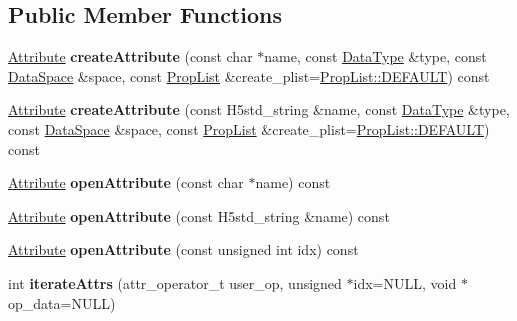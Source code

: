\subsection*{Public Member Functions}
\begin{DoxyCompactItemize}
\item 
\mbox{\label{class_h5_1_1_h5_object_acf6c4ca827b3cc08592d78c4b65252d6}} 
\hyperlink{class_h5_1_1_attribute}{Attribute} {\bfseries create\+Attribute} (const char $\ast$name, const \hyperlink{class_h5_1_1_data_type}{Data\+Type} \&type, const \hyperlink{class_h5_1_1_data_space}{Data\+Space} \&space, const \hyperlink{class_h5_1_1_prop_list}{Prop\+List} \&create\+\_\+plist=\hyperlink{class_h5_1_1_prop_list_ae52af66ce82af0ea7e6dc57148c56241}{Prop\+List\+::\+D\+E\+F\+A\+U\+LT}) const
\item 
\mbox{\label{class_h5_1_1_h5_object_a20cba569ffbb46859164668ab536b38f}} 
\hyperlink{class_h5_1_1_attribute}{Attribute} {\bfseries create\+Attribute} (const H5std\+\_\+string \&name, const \hyperlink{class_h5_1_1_data_type}{Data\+Type} \&type, const \hyperlink{class_h5_1_1_data_space}{Data\+Space} \&space, const \hyperlink{class_h5_1_1_prop_list}{Prop\+List} \&create\+\_\+plist=\hyperlink{class_h5_1_1_prop_list_ae52af66ce82af0ea7e6dc57148c56241}{Prop\+List\+::\+D\+E\+F\+A\+U\+LT}) const
\item 
\mbox{\label{class_h5_1_1_h5_object_a0327a8a39d3578db30c050472e662c33}} 
\hyperlink{class_h5_1_1_attribute}{Attribute} {\bfseries open\+Attribute} (const char $\ast$name) const
\item 
\mbox{\label{class_h5_1_1_h5_object_aa694dbcac2a59f39be6fba61d03793c4}} 
\hyperlink{class_h5_1_1_attribute}{Attribute} {\bfseries open\+Attribute} (const H5std\+\_\+string \&name) const
\item 
\mbox{\label{class_h5_1_1_h5_object_a762bab75b1c150e3928f66d3d65d2269}} 
\hyperlink{class_h5_1_1_attribute}{Attribute} {\bfseries open\+Attribute} (const unsigned int idx) const
\item 
\mbox{\label{class_h5_1_1_h5_object_a06836076a40d8677256dbd89563e7578}} 
int {\bfseries iterate\+Attrs} (attr\+\_\+operator\+\_\+t user\+\_\+op, unsigned $\ast$idx=N\+U\+LL, void $\ast$op\+\_\+data=N\+U\+LL)

\end{DoxyCompactItemize}
